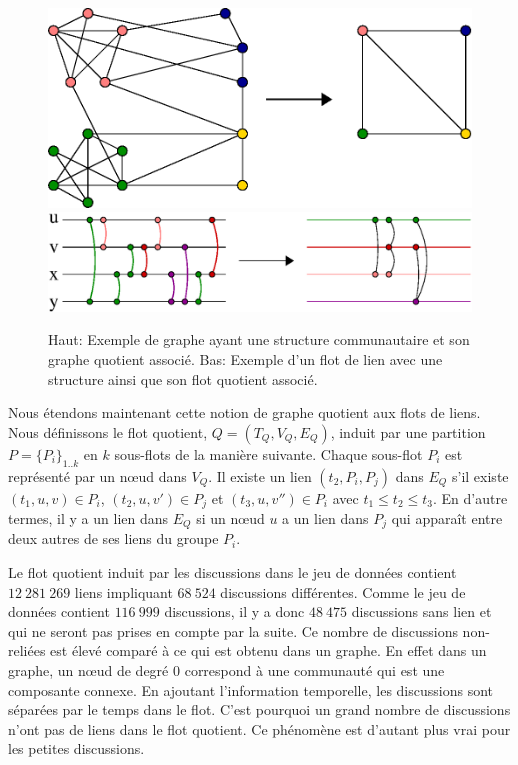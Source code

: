 \begin{figure}
\centering
	\includegraphics[width=0.50\linewidth]{img/mailing/graph-quotient}
	\vfill
	\includegraphics[width=0.75\linewidth]{img/mailing/stream-quotient}
	\caption{Haut: Exemple de graphe ayant une structure communautaire et son graphe quotient associé. Bas: Exemple d'un flot de lien avec une structure ainsi que son flot quotient associé.}
	\label{fig:graph-quotient}
\end{figure}

Nous étendons maintenant cette notion de graphe quotient aux flots de liens.
Nous définissons le flot quotient, $Q=(T_Q,V_Q,E_Q)$, induit par une partition $P=\{{P_i}\}_{1..k}$ en $k$ sous-flots de la manière suivante.
Chaque sous-flot $P_i$ est représenté par un n\oe{}ud dans $V_Q$.
Il existe un lien $(t_2,P_i,P_j)$ dans $E_Q$ s'il existe $(t_1,u,v) \in P_i$, $(t_2,u,v') \in P_j$ et $(t_3,u,v'') \in P_i$ avec $t_1 \leq t_2 \leq t_3$.
En d'autre termes, il y a un lien dans $E_Q$ si un n\oe{}ud $u$ a un lien dans $P_j$ qui apparaît entre deux autres de ses liens du groupe $P_i$.

Le flot quotient induit par les discussions dans le jeu de données contient $12\ 281\ 269$ liens impliquant $68\ 524$ discussions différentes.
Comme le jeu de données contient $116\ 999$ discussions, il y a donc $48\ 475$ discussions sans lien et qui ne seront pas prises en compte par la suite.
Ce nombre de discussions non-reliées est élevé comparé à ce qui est obtenu dans un graphe.
En effet dans un graphe, un n\oe{}ud de degré $0$ correspond à une communauté qui est une composante connexe.
En ajoutant l'information temporelle, les discussions sont séparées par le temps dans le flot.
C'est pourquoi un grand nombre de discussions n'ont pas de liens dans le flot quotient.
Ce phénomène est d'autant plus vrai pour les petites discussions.



